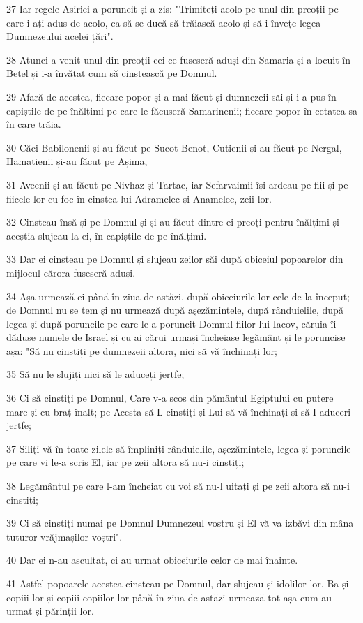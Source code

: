 \par 27 Iar regele Asiriei a poruncit și a zis: "Trimiteți acolo pe unul din preoții pe care i-ați adus de acolo, ca să se ducă să trăiască acolo și să-i învețe legea Dumnezeului acelei țări".
\par 28 Atunci a venit unul din preoții cei ce fuseseră aduși din Samaria și a locuit în Betel și i-a învățat cum să cinstească pe Domnul.
\par 29 Afară de acestea, fiecare popor și-a mai făcut și dumnezeii săi și i-a pus în capiștile de pe înălțimi pe care le făcuseră Samarinenii; fiecare popor în cetatea sa în care trăia.
\par 30 Căci Babilonenii și-au făcut pe Sucot-Benot, Cutienii și-au făcut pe Nergal, Hamatienii și-au făcut pe Așima,
\par 31 Aveenii și-au făcut pe Nivhaz și Tartac, iar Sefarvaimii își ardeau pe fiii și pe fiicele lor cu foc în cinstea lui Adramelec și Anamelec, zeii lor.
\par 32 Cinsteau însă și pe Domnul și și-au făcut dintre ei preoți pentru înălțimi și aceștia slujeau la ei, în capiștile de pe înălțimi.
\par 33 Dar ei cinsteau pe Domnul și slujeau zeilor săi după obiceiul popoarelor din mijlocul cărora fuseseră aduși.
\par 34 Așa urmează ei până în ziua de astăzi, după obiceiurile lor cele de la început; de Domnul nu se tem și nu urmează după așezămintele, după rânduielile, după legea și după poruncile pe care le-a poruncit Domnul fiilor lui Iacov, căruia îi dăduse numele de Israel și cu ai cărui urmași încheiase legământ și le poruncise așa: "Să nu cinstiți pe dumnezeii altora, nici să vă închinați lor;
\par 35 Să nu le slujiți nici să le aduceți jertfe;
\par 36 Ci să cinstiți pe Domnul, Care v-a scos din pământul Egiptului cu putere mare și cu braț înalt; pe Acesta să-L cinstiți și Lui să vă închinați și să-I aduceri jertfe;
\par 37 Siliți-vă în toate zilele să împliniți rânduielile, așezămintele, legea și poruncile pe care vi le-a scris El, iar pe zeii altora să nu-i cinstiți;
\par 38 Legământul pe care l-am încheiat cu voi să nu-l uitați și pe zeii altora să nu-i cinstiți;
\par 39 Ci să cinstiți numai pe Domnul Dumnezeul vostru și El vă va izbăvi din mâna tuturor vrăjmașilor voștri".
\par 40 Dar ei n-au ascultat, ci au urmat obiceiurile celor de mai înainte.
\par 41 Astfel popoarele acestea cinsteau pe Domnul, dar slujeau și idolilor lor. Ba și copiii lor și copiii copiilor lor până în ziua de astăzi urmează tot așa cum au urmat și părinții lor.

